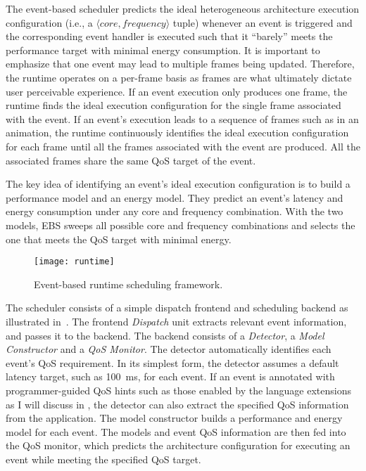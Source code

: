The event-based scheduler predicts the ideal heterogeneous architecture execution configuration (i.e., a $\langle core, frequency \rangle$ tuple) whenever an event is triggered and the corresponding event handler is executed such that it ``barely'' meets the performance target with minimal energy consumption. It is important to emphasize that one event may lead to multiple frames being updated. Therefore, the \ebs runtime operates on a per-frame basis as frames are what ultimately dictate user perceivable experience. If an event execution only produces one frame, the runtime finds the ideal execution configuration for the single frame associated with the event. If an event's execution leads to a sequence of frames such as in an animation, the runtime continuously identifies the ideal execution configuration for each frame until all the frames associated with the event are produced. All the associated frames share the same QoS target of the event.

The key idea of identifying an event's ideal execution configuration is to build a performance model and an energy model. They predict an event's latency and energy consumption under any core and frequency combination. With the two models, EBS sweeps all possible core and frequency combinations and selects the one that meets the QoS target with minimal energy.

\begin{figure}[t]
\centering
\texttt{[image: runtime]}
\caption{Event-based runtime scheduling framework.}
\label{fig:runtime}
\end{figure}

The scheduler consists of a simple dispatch frontend and scheduling backend as illustrated in~. The frontend \textit{Dispatch} unit extracts relevant event information, and passes it to the backend. The backend consists of a \textit{Detector}, a \textit{Model Constructor} and a \textit{QoS Monitor}. The detector automatically identifies each event's QoS requirement. In its simplest form, the detector assumes a default latency target, such as 100~ms, for each event. If an event is annotated with programmer-guided QoS hints such as those enabled by the \greenweb language extensions as I will discuss in , the detector can also extract the specified QoS information from the application. The model constructor builds a performance and energy model for each event. The models and event QoS information are then fed into the QoS monitor, which predicts the architecture configuration for executing an event while meeting the specified QoS target.

